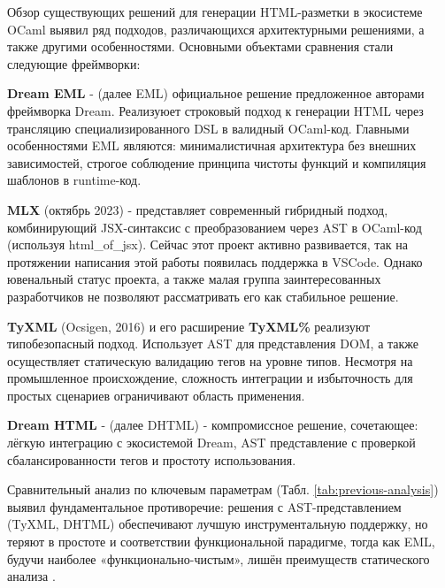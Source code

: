 Обзор существующих решений для генерации HTML-разметки в экосистеме OCaml выявил ряд подходов, различающихся архитектурными решениями, а также другими особенностями.
Основными объектами сравнения стали следующие фреймворки:

\textbf{Dream EML} - (далее EML) официальное решение предложенное авторами фреймворка Dream.
Реализуюет строковый подход к генерации HTML через трансляцию специализированного DSL в валидный OCaml-код.
Главными особенностями EML являются: минималистичная архитектура без внешних зависимостей, строгое соблюдение принципа чистоты функций и компиляция шаблонов в runtime-код.

\textbf{MLX} (октябрь 2023) - представляет современный гибридный подход, комбинирующий JSX-синтаксис с преобразованием через AST в OCaml-код (используя html\_of\_jsx).
Сейчас этот проект активно развивается, так на протяжении написания этой работы появилась поддержка в VSCode.
Однако ювенальный статус проекта, а также малая группа заинтересованных разработчиков не позволяют рассматривать его как стабильное решение.

\textbf{TyXML} (Ocsigen, 2016) и его расширение \textbf{TyXML\%} реализуют типобезопасный подход.
Использует AST для представления DOM, а также осуществляет статическую валидацию тегов на уровне типов.
Несмотря на промышленное происхождение, сложность интеграции и избыточность для простых сценариев ограничивают область применения.

\textbf{Dream HTML} - (далее DHTML) - компромиссное решение, сочетающее: лёгкую интеграцию с экосистемой Dream, AST представление с проверкой сбалансированности тегов и простоту использования.

Сравнительный анализ по ключевым параметрам (Табл. \ref{tab:previous-analysis}) выявил фундаментальное противоречие:
решения с AST-представлением (TyXML, DHTML) обеспечивают лучшую инструментальную поддержку, но теряют в простоте и соответствии функциональной парадигме, тогда как EML, будучи наиболее «функционально-чистым», лишён преимуществ статического анализа \cite{}. %

